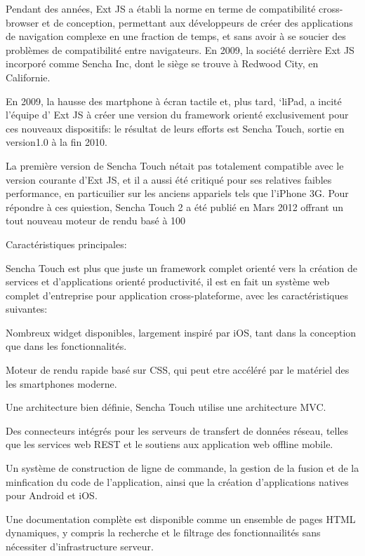 Pendant des années, Ext JS a établi la norme en terme de compatibilité cross-browser et de conception, permettant aux développeurs de créer des applications de navigation complexe en une fraction de temps, et sans avoir à se soucier des problèmes de compatibilité entre navigateurs. En 2009, la société derrière Ext JS incorporé comme Sencha Inc, dont le siège se trouve à Redwood City, en Californie.

En 2009, la hausse des martphone à écran tactile et, plus tard, ‘liPad, a incité l’équipe d’ Ext JS à créer une version du framework orienté exclusivement pour ces nouveaux dispositifs: le résultat de leurs efforts est Sencha Touch, sortie en version1.0 à la fin 2010.

La première version de Sencha Touch nétait pas totalement compatible avec le version courante d’Ext JS, et il a aussi été critiqué pour ses relatives faibles performance, en particuilier sur les anciens appariels tels que l’iPhone 3G. Pour répondre à ces quiestion, Sencha Touch 2 a été publié en Mars 2012 offrant un tout nouveau moteur de rendu basé à 100%

Caractéristiques principales:

Sencha Touch est plus que juste un framework complet orienté vers la création de services et d’applications orienté productivité,  il est en fait un système web complet d’entreprise pour application cross-plateforme, avec les caractéristiques suivantes:

    Nombreux widget disponibles, largement inspiré par iOS, tant dans la conception que dans les fonctionnalités.

    Moteur de rendu rapide basé sur CSS, qui peut etre accéléré par le matériel des les smartphones moderne.

    Une architecture bien définie,  Sencha Touch utilise une architecture MVC.

    Des connecteurs intégrés pour les serveurs de transfert de données réseau, telles que les services web REST et le soutiens aux application web offline mobile.

    Un système de construction de ligne de commande, la gestion de la fusion et de la minfication du code de l’application, ainsi que la création d’applications natives pour Android et iOS.

Une documentation complète est disponible comme un ensemble de pages HTML dynamiques, y compris la recherche et le filtrage des fonctionnailités sans nécessiter d’infrastructure serveur.

